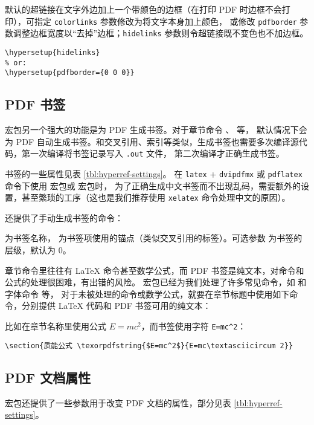 默认的超链接在文字外边加上一个带颜色的边框（在打印 PDF 时边框不会打印），可指定 \texttt{color\-links} 参数修改为将文字本身加上颜色，
或修改 \texttt{pdf\-border} 参数调整边框宽度以“去掉”边框；\texttt{hide\-links} 参数则令超链接既不变色也不加边框。
\begin{verbatim}
\hypersetup{hidelinks}
% or:
\hypersetup{pdfborder={0 0 0}}
\end{verbatim}

\subsection{PDF 书签}\label{subsec:pdf-bookmark}

 宏包另一个强大的功能是为 PDF 生成书签。对于章节命令 、 等，
默认情况下会为 PDF 自动生成书签。和交叉引用、索引等类似，生成书签也需要多次编译源代码，第一次编译将书签记录写入 \texttt{.out} 文件，
第二次编译才正确生成书签。

书签的一些属性见表 \ref{tbl:hyperref-settings}。
在 \texttt{latex} + \texttt{dvipdfmx} 或 \texttt{pdflatex} 命令下使用  宏包或  宏包时，
为了正确生成中文书签而不出现乱码，需要额外的设置，甚至繁琐的工序（这也是我们推荐使用 \texttt{xelatex} 命令处理中文的原因）。

 还提供了手动生成书签的命令：
\begin{command}
\end{command}
 为书签名称， 为书签项使用的锚点（类似交叉引用的标签）。可选参数  为书签的层级，默认为 0。

章节命令里往往有 \LaTeX{} 命令甚至数学公式，而 PDF 书签是纯文本，对命令和公式的处理很困难，有出错的风险。
 宏包已经为我们处理了许多常见命令，如  和字体命令  等，
对于未被处理的命令或数学公式，就要在章节标题中使用如下命令，分别提供 \LaTeX{} 代码和 PDF 书签可用的纯文本：
\begin{command}
\end{command}
比如在章节名称里使用公式 $E=mc^2$，而书签使用字符 \texttt{E=mc\textasciicircum 2}：
\begin{verbatim}
\section{质能公式 \texorpdfstring{$E=mc^2$}{E=mc\textasciicircum 2}}
\end{verbatim}

\subsection{PDF 文档属性}\label{subsec:pdf-settings}

 宏包还提供了一些参数用于改变 PDF 文档的属性，部分见表 \ref{tbl:hyperref-settings}。


\endinput
